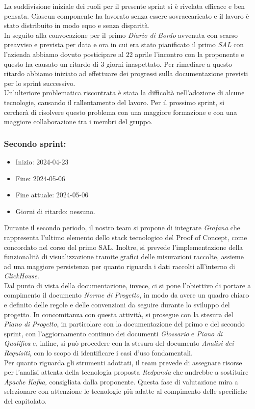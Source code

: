 La suddivisione iniziale dei ruoli per il presente sprint si è rivelata efficace e ben pensata. Ciascun componente ha lavorato senza essere sovraccaricato e il lavoro è stato distribuito in modo equo e senza disparità. \\
In seguito alla convocazione per il primo \textit{Diario di Bordo} avvenuta con scarso preavviso e prevista per data e ora in cui era stato pianificato il primo \textit{SAL} con l'azienda abbiamo dovuto posticipare al 22 aprile l'incontro con la proponente e questo ha causato un ritardo di 3 giorni inaspettato. Per rimediare a questo ritardo abbiamo iniziato ad effettuare dei progressi sulla documentazione previsti per lo sprint successivo. \\
Un'ulteriore problematica riscontrata è stata la difficoltà nell'adozione di alcune tecnologie, causando il rallentamento del lavoro. Per il prossimo sprint, si cercherà di risolvere questo problema con una maggiore formazione e con una maggiore collaborazione tra i membri del gruppo.

\newpage
\subsubsection{Secondo sprint:}
\begin{itemize}
    \item Inizio: 2024-04-23
    \item Fine: 2024-05-06
    \item Fine attuale: 2024-05-06
    \item Giorni di ritardo: nessuno.
\end{itemize}

Durante il secondo periodo, il nostro team si propone di integrare \textit{Grafana} che rappresenta l'ultimo elemento dello stack tecnologico del Proof of Concept, come concordato nel corso del primo SAL. Inoltre, si prevede l'implementazione della funzionalità di visualizzazione tramite grafici delle misurazioni raccolte,
assieme ad una maggiore persistenza per quanto riguarda i dati raccolti all'interno di \textit{ClickHouse}. \\
Dal punto di vista della documentazione, invece, ci si pone l'obiettivo di portare a compimento il documento \textit{Norme di Progetto}, in modo da avere un quadro chiaro e definito delle regole e delle convenzioni da seguire durante lo sviluppo del progetto. In concomitanza con questa attività, si prosegue con la stesura del \textit{Piano di Progetto}, in particolare con la documentazione del primo e del secondo sprint, con l'aggiornamento continuo dei documenti \textit{Glossario} e \textit{Piano di Qualifica} e, infine, si può procedere con la stesura del documento \textit{Analisi dei Requisiti}, con lo scopo di identificare i casi d'uso fondamentali. \\
Per quanto riguarda gli strumenti adottati, il team prevede di assegnare risorse per l'analisi attenta della tecnologia proposta \textit{Redpanda} che andrebbe a sostituire \textit{Apache Kafka}, consigliata dalla proponente. Questa fase di valutazione mira a selezionare con attenzione le tecnologie più adatte al compimento delle specifiche del capitolato.

